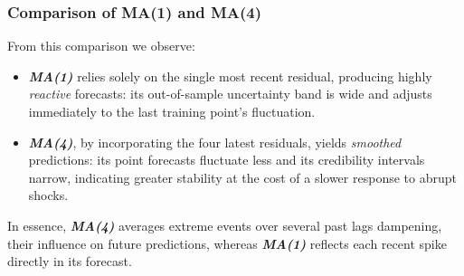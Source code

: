 \documentclass{Configuration_Files/PoliMi3i_thesis}
\begin{document}
\newpage
\subsubsection*{Comparison of MA(1) and MA(4)}
 From this comparison we observe:

\begin{itemize}
  \item \textbf{\textit{MA(1)}} relies solely on the single most recent residual, producing highly \emph{reactive} forecasts: its out-of-sample uncertainty band is wide and adjusts immediately to the last training point’s fluctuation.
  \item \textbf{\textit{MA(4)}}, by incorporating the four latest residuals, yields \emph{smoothed} predictions: its point forecasts fluctuate less and its credibility intervals narrow, indicating greater stability at the cost of a slower response to abrupt shocks.
\end{itemize}

In essence, \textbf{\textit{MA(4)}} averages extreme events over several past lags dampening, their influence on future predictions, whereas \textbf{\textit{MA(1)}} reflects each recent spike directly in its forecast.

\bigskip




\end{document}
